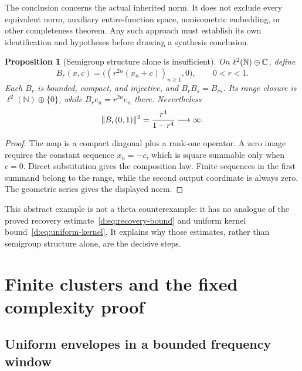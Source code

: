 \documentclass[11pt,a4paper]{article}
\numberwithin{equation}{section}
\newtheorem{proposition}[theorem]{Proposition}
\theoremstyle{definition}\newtheorem{definition}[theorem]{Definition}
\theoremstyle{remark}\newtheorem{remark}[theorem]{Remark}
\begin{document}
The conclusion concerns the actual inherited norm. It does not exclude every equivalent norm, auxiliary entire-function space, nonisometric embedding, or other completeness theorem. Any such approach must establish its own identification and hypotheses before drawing a synthesis conclusion.


\begin{proposition}[Semigroup structure alone is insufficient]\label{d:prop:semigroup-model}
On $\ell^2(\mathbb N)\oplus\mathbb C$, define
\[
 B_r(x,c)=\bigl((r^{2n}(x_n+c))_{n\ge1},0\bigr),\qquad 0<r<1.
\]
Each $B_r$ is bounded, compact, and injective, and $B_rB_s=B_{rs}$. Its range closure is $\ell^2(\mathbb N)\oplus\{0\}$, while $B_re_n=r^{2n}e_n$ there. Nevertheless
\[
 \lVert B_r(0,1)\rVert^2=\frac{r^4}{1-r^4}\longrightarrow\infty.
\]
\end{proposition}
\begin{proof}
The map is a compact diagonal plus a rank-one operator. A zero image requires the constant sequence $x_n=-c$, which is square summable only when $c=0$. Direct substitution gives the composition law. Finite sequences in the first summand belong to the range, while the second output coordinate is always zero. The geometric series gives the displayed norm.
\end{proof}

This abstract example is not a theta counterexample: it has no analogue of the proved recovery estimate~\eqref{d:eq:recovery-bound} and uniform kernel bound~\eqref{d:eq:uniform-kernel}. It explains why those estimates, rather than semigroup structure alone, are the decisive steps.


\section{Finite clusters and the fixed complexity proof}\label{app:clusters}


\subsection{Uniform envelopes in a bounded frequency window}\label{e:sec:ode}
\end{document}
